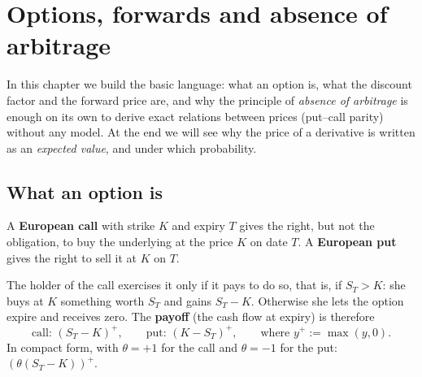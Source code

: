 \chapter{Options, forwards and absence of arbitrage}
\label{cap:opzioni}

In this chapter we build the basic language: what an option is, what the discount factor and the forward price are,
and why the principle of \emph{absence of arbitrage} is enough on its own to derive exact relations between prices
(put--call parity) without any model. At the end we will see why the price of a derivative is written as an
\emph{expected value}, and under which probability.

\section{What an option is}

\begin{definizione}
A \textbf{European call} with strike $K$ and expiry $T$ gives the right, but not the obligation, to buy the
underlying at the price $K$ on date $T$. A \textbf{European put} gives the right to sell it at $K$ on $T$.
\end{definizione}

The holder of the call exercises it only if it pays to do so, that is, if $S_T>K$: she buys at $K$ something worth
$S_T$ and gains $S_T-K$. Otherwise she lets the option expire and receives zero. The \textbf{payoff} (the cash flow at
expiry) is therefore
\begin{equation}
\text{call: } (S_T-K)^+ ,\qquad \text{put: } (K-S_T)^+ ,\qquad\text{where } y^+:=\max(y,0).
\end{equation}
In compact form, with $\theta=+1$ for the call and $\theta=-1$ for the put: $(\theta(S_T-K))^+$.

\begin{center}
\end{center}

